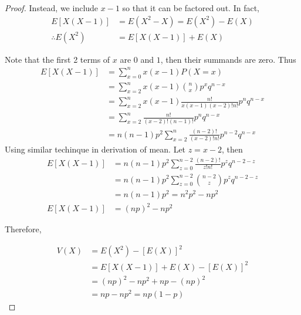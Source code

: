 \begin{proof}
Instead, we include $x-1$ so that it can be factored out. In fact, 
\begin{align*}
    E[X(X-1)] &= E(X^2 - X) = E(X^2) - E(X) \\
    \therefore E(X^2) &= E[X(X-1)] + E(X)
\end{align*}


Note that the first 2 terms of $x$ are $0$ and $1$, then their summands are zero. Thus
\begin{align*}
    E[X(X-1)]
        &= \sum^{n}_{x = 0} x(x-1)P(X=x)\\
        &= \sum_{x = 2}^n x(x-1){\binom{n}{x} p^x q^{n - x}} \\
        &= \sum_{x = 2}^{n} {x(x-1) \frac{n!}{x(x-1)(x-2)!n!}  p^n q^{n - x }} \\
        &= \sum_{x = 2}^{n} {\frac{n!}{(x-2)!(n-1)!}  p^n q^{n - x  }}\\
        &= n(n-1)p^2  \sum_{x = 2}^{n} {\frac{(n-2)!}{(x-2)!n!}  p^{n-2} q^{n - x  }}
\end{align*}
Using similar techinque in derivation of mean. Let $z = x - 2$, then
\begin{align*}
    E[X(X-1)]
        &= n(n-1)p^2  \sum_{z= 0}^{n-2} {\frac{(n-2)!}{z!n!}  p^{z} q^{n - 2 - z }} \\ 
        &= n(n-1)p^2  \sum_{z= 0}^{n-2} {\binom{n-2}{z}  p^{z} q^{n - 2 - z }} \\
        &= n(n-1)p^2 = n^2p^2 - np^2 \\
   E[X(X-1)] &= {(np)}^2 - np^2
\end{align*}

Therefore,

\begin{align*}
    V(X) &=  E(X^2) - {[E(X)]}^2 \\
        &= E[X(X-1)] + E(X) - {[E(X)]}^2 \\
        &= {(np)}^2 - np^2 + np - {(np)}^2 \\
        &= np - np^2 = np(1-p)
\end{align*}

\end{proof}
